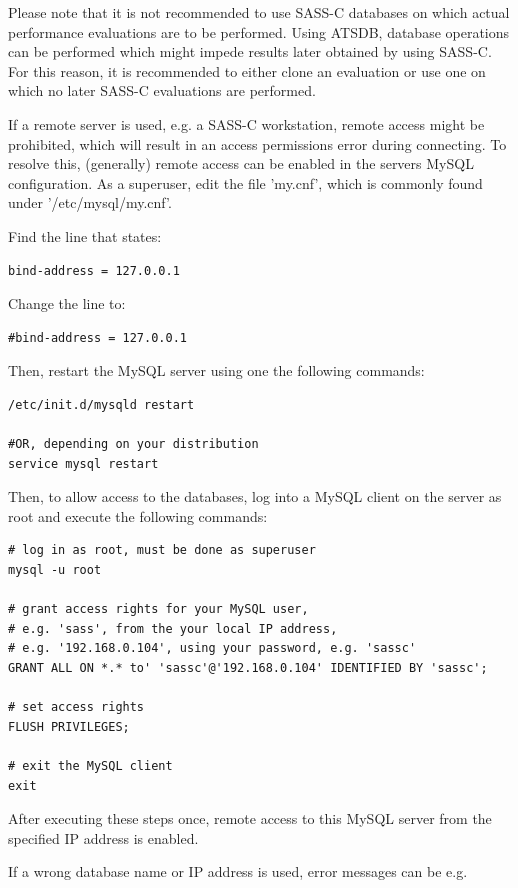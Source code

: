 \documentclass[10pt,letterpaper,extrafontsizes]{memoir}
\begin{document}
Please note that it is not recommended to use SASS-C databases on which actual performance evaluations are to be performed. Using ATSDB, database operations can be performed which might impede results later obtained by using SASS-C. For this reason, it is recommended to either clone an evaluation or use one on which no later SASS-C evaluations are performed.

If a remote server is used, e.g. a SASS-C workstation, remote access might be prohibited, which will result in an access permissions error during connecting. To resolve this, (generally) remote access can be enabled in the servers MySQL configuration. As a superuser, edit the file 'my.cnf', which is commonly found under '/etc/mysql/my.cnf'. 

Find the line that states:
\begin{verbatim}
bind-address = 127.0.0.1
\end{verbatim}

Change the line to:

\begin{verbatim}
#bind-address = 127.0.0.1
\end{verbatim}

Then, restart the MySQL server using one the following commands:

\begin{verbatim}
/etc/init.d/mysqld restart

#OR, depending on your distribution
service mysql restart
\end{verbatim}

Then, to allow access to the databases, log into a MySQL client on the server as root and execute the following commands:

\begin{verbatim}
# log in as root, must be done as superuser
mysql -u root

# grant access rights for your MySQL user, 
# e.g. 'sass', from the your local IP address, 
# e.g. '192.168.0.104', using your password, e.g. 'sassc'
GRANT ALL ON *.* to' 'sassc'@'192.168.0.104' IDENTIFIED BY 'sassc';

# set access rights
FLUSH PRIVILEGES;

# exit the MySQL client
exit
\end{verbatim}

After executing these steps once, remote access to this MySQL server from the specified IP address is enabled.

If  a  wrong  database  name  or  IP  address  is  used,  error  messages  can  be  e.g.  \\
\end{document}
